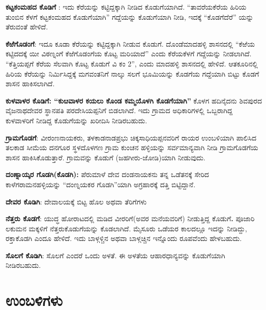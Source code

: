 \textbf{ಕಟ್ಟಕಂಮಹದ ಕೊಡಿಗೆ} : ಇದು ಕೆರೆಯನ್ನು ಕಟ್ಟಿದ್ದಕ್ಕಾಗಿ ನೀಡಿದ ಕೊಡುಗೆಯಾಗಿದೆ. “ತಾವರೆಯಕೆರೆಯ ಹಿರಿಯ ತುಂಬಿನ ಕೆಳಗೆ ಕಟ್ಟಕಂಮಹದ ಕೊಡುಗೆಯಾಗಿ” ಗದ್ದೆಯನ್ನು ಕೊಡುಗೆಯಾಗಿ ನೀಡಿ, ಇದಕ್ಕೆ “ಕೊಡಗೆದೆರೆ” ಯನ್ನು ತೆರುವಂತೆ ಹೇಳಿದೆ.

\textbf{ಕೆಱೆಗೊಡಂಗೆ}: ಇದೂ ಕೂಡಾ ಕೆರೆಯನ್ನು ಕಟ್ಟಿದ್ದಕ್ಕಾಗಿ ನೀಡುವ ಕೊಡುಗೆ. ದೊಂಡೆಮಾದಹಳ್ಳಿ ಶಾಸನದಲ್ಲಿ “ಕೆಱೆಯ ಕಟ್ಟಿದದಕ್ಕೆ ಯೀ ವಿಠಣ್ನಂಗೆ ಕೆಱೆಗೊಡಂಗೆಯ ಕೊಟ್ಟ ಮರಿಯಾದೆ” ಎಂದು ಕೆರೆಯಕೆಳಗೆ ಗದ್ದೆಯನ್ನು ನೀಡಲಾಗಿದೆ. “ಕೆತ್ತಿಯಪ್ಪಗೆ ಕೆರೆಯ ಸೆಲವಾಗಿ ಕೊಟ್ಟ ಕೊಡುಗೆ ವಿ ಕಂ 2”, ಎಂದು ಮಾದಹಳ್ಳಿ ಶಾಸನದಲ್ಲಿ ಹೇಳಿದೆ. ಆತಕೂರಿನಲ್ಲಿ ಹಿರಿಯ ಕೆರೆಯನ್ನು ನಿರ್ಮಿಸಿದ್ದಕ್ಕೆ ಮಗವಂತನಿಗೆ ನಾಲ್ಕು ಸಲಗೆ ಭೂಮಿಯನ್ನು ಕೊಡಗೆಯ ಗದ್ದೆಯಾಗಿ ಬಿಟ್ಟು ಕೊಡಗೆ ಶಾಸನ ಹಾಕಿಸಲಾಗಿದೆ.

\textbf{ಕುಳವಾಳರ ಕೊಡಿಗೆ: “ಕುೞವಾಳರ ಕಯಲು ಕೊಂಡ ಕಮ್ಮಯೊಳಗಿ ಕೊಡಗೆಯಾಗಿ”} ಕೊಳಗ ಹದಿನೈದನು ಶಿವಪುರದ ವೈಜನಾಥದೇವರ ಸ್ಥಾನಪತಿ ಪರದೇಸಿಯಪ್ಪನಿಗೆ ಬಿಡಲಾಗಿದೆ. ಇದು ಗ್ರಾಮದ ಅಧಿಕಾರಿಗಳಲ್ಲಿ ಒಬ್ಬರಾಗಿದ್ದ ಕುಳವಾಳರಿಗೆ ನೀಡಿದ್ದ ಕೊಡುಗೆಯನ್ನು ಖರೀದಿಸಿ ನೀಡಿರಬಹುದು.

\textbf{ಗ್ರಾಮಗೊಡಗೆ}: ವೀರಂಣನಾಯಕರು, ತಳಕಾಡನಾಡಪ್ರಭು ಚಿಕ್ಕಸಾಧಿಯಪ್ಪನವರಿಗೆ ರಾಯರ ಉಂಬಳಿಯಾಗಿ ಪಾಲಿಸಿದ ತಲಕಾಡ ಸೀಮೆಯ ದನಗೂರ ಸ್ಥಳದೊಳಗಣ ಗ್ರಾಮ ಕುಂಚನ ಹಳ್ಳಿಯನ್ನು ಸರ್ವಮಾನ್ಯವಾಗಿ ನೀಡಿ ಗ್ರಾಮ\-ಗೊಡಗೆಯ ಶಾಸನ ಹಾಕಿಸಿಕೊಡುತ್ತಾರೆ. ಗ್ರಾಮವನ್ನು ಕೊಡುಗೆ (ಜಹಗೀರು-ಜೋಡಿ)ಯಾಗಿ ನೀಡುವುದು.

\textbf{ದಂಣ್ನಾಯ್ಕರ ಗೊಡಗಿ(ಕೊಡಗಿ):} ಪೆರುಮಾಳೆ ದೇವ ದಂಡನಾಯಕನು ತನ್ನ ಒಡೆತನಕ್ಕೆ ಸೇರಿದ ಕಾಳೆಗರಾಮನಹಳ್ಳಿ\-ಯನ್ನು “ದಂಣ್ನಯಕರ ಗೊಡಗಿ”ಯಾಗಿ ಅಗ್ರಹಾರಕ್ಕೆ ದತ್ತಿ ಬಿಟ್ಟಿದ್ದಾನೆ.

\textbf{ದೇವರ ಕೊಡಿಗಿ}: ದೇವಾಲಯಕ್ಕೆ ಬಿಟ್ಟ ಹೊಲ ಅಥವಾ ತೆರಿಗೆಗಳು

\textbf{ನೆತ್ತರು ಕೊಡಗೆ}: ಯುದ್ಧ ಹೋರಾಟದಲ್ಲಿ ಮಡಿದ ವೀರರಿಗೆ(ಅವರ ಮನೆಯವರಿಗೆ) ನೀಡುತ್ತಿದ್ದ ಕೊಡುಗೆ\textbf{.\general{\break } }ಪೂಜಾರಿ ಲಕುಮನ ಮಕ್ಕಳಿಗೆ ನೆತ್ತರುಕೊಡುಗೆಯನ್ನು ಕೊಡಲಾಗಿದೆ. ಮೈಸೂರು ಒಡೆಯರ ಕಾಲದಲ್ಲೂ ಇದನ್ನು ನೀಡಿದ್ದು, ರಕ್ತಾಕೊಡಗಿ ಎಂದೂ ಹೇಳಿದೆ. ಇದು ಬಾಳ್ಗಳ್ಚಿನ ಅಥವಾ ಬಾಳ್ಗಚ್ಚಿನ ಇನ್ನೊಂದು ರೂಪವೆಂದು ಹೇಳಬಹುದು.

\textbf{ಸೊಲಗೆ ಕೊಡಿಗಿ}: ಸೊಲಗೆ ಎಂದರೆ ಒಂದು ಅಳತೆ. ಈ ಅಳತೆಯ ಆಹಾರಧಾನ್ಯವನ್ನು ಕೊಡುಗೆಯಾಗಿ ನೀಡಿರಬಹುದು.


\section{ಉಂಬಳಿಗಳು}

